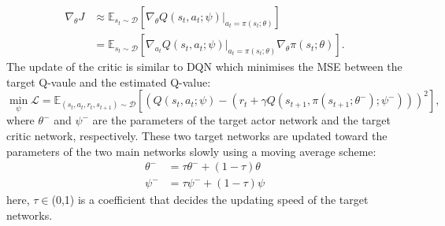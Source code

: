 \begin{align}
    \nabla_{\theta}J &\approx\mathbb{E}_{s_{t}\sim\mathcal{D}}[\nabla_{\theta}Q(s_{t}, a_{t};\psi)|_{a_{t}=\pi(s_{t};\theta)}]\\
    & = \mathbb{E}_{s_{t}\sim\mathcal{D}}[\nabla_{a_{t}}Q(s_{t}, a_{t};\psi)|_{a_{t}=\pi(s_{t};\theta)} \nabla_{\theta}\pi(s_{t};\theta)].
\end{align}
The update of the critic is similar to DQN which minimises the MSE between the target Q-vaule and the estimated Q-value:
\begin{equation}
    \min_{\psi}\mathcal{L} = \mathbb{E}_{(s_{t}, a_{t}, r_{t}, s_{t+1})\sim\mathcal{D}}[(Q(s_{t}, a_{t};\psi) - (r_{t} + \gamma Q(s_{t+1}, \pi(s_{t+1};\theta^{-});\psi^{-})))^{2}],
\end{equation}
where $\theta^{-}$ and $\psi^{-}$ are the parameters of the target actor network and the target critic network, respectively. These two target networks are updated toward the parameters of the two main networks slowly using a moving average scheme:
\begin{align}
    \theta^{-} &= \tau\theta^{-} + (1-\tau)\theta\\
    \psi^{-} &= \tau\psi^{-} + (1-\tau)\psi
\end{align}
here, $\tau\in$(0,1) is a coefficient that decides the updating speed of the target networks. 

